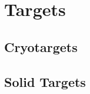 \section{Targets}
\lipsum[1-2]

\subsection{Cryotargets}
\lipsum[1-2]

\subsection{Solid Targets}
\lipsum[1-2]
